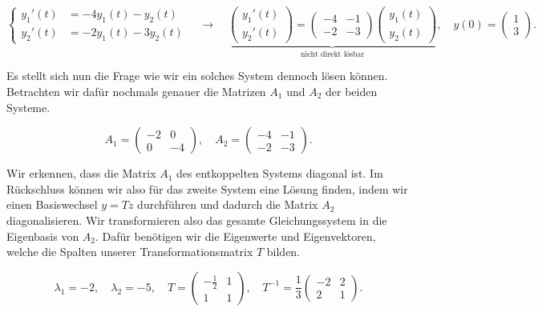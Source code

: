 \begin{equation*}
    \left\{ 
        \begin{aligned}
            y_1'(t) &= -4 y_1(t) - y_2(t) \\
            y_2'(t) &= -2 y_1(t) - 3 y_2(t)
        \end{aligned}
    \right. \quad \longrightarrow \quad
    \underbrace{\begin{pmatrix}
        y_1'(t) \\
        y_2'(t)
    \end{pmatrix} =
    \begin{pmatrix}
        -4 & -1 \\
        -2 & -3
    \end{pmatrix}
    \begin{pmatrix}
        y_1(t) \\
        y_2(t)
    \end{pmatrix}}_{\text{nicht direkt lösbar}}, \quad y(0)=
    \begin{pmatrix}
        1 \\
        3
    \end{pmatrix}.
\end{equation*}

Es stellt sich nun die Frage wie wir ein solches System dennoch lösen können. Betrachten wir dafür nochmals genauer die Matrizen \( A_1\) und \( A_2 \) der beiden Systeme.

\begin{equation*}
    A_1 = \begin{pmatrix}
        -2 & 0 \\
        0 & -4
    \end{pmatrix}, \quad
    A_2 = \begin{pmatrix}
        -4 & -1 \\
        -2 & -3
    \end{pmatrix}.
\end{equation*}

Wir erkennen, dass die Matrix \( A_1 \) des entkoppelten Systems diagonal ist. Im Rückschluss können wir also für das zweite System eine Lösung finden, indem wir einen Basiswechsel \( y = Tz \) durchführen und dadurch die Matrix \( A_2 \) diagonalisieren. Wir transformieren also das gesamte Gleichungssystem in die Eigenbasis von \( A_2 \). Dafür benötigen wir die Eigenwerte und Eigenvektoren, welche die Spalten unserer Transformationsmatrix \( T \) bilden.   

\begin{equation*}
    \lambda_1 = -2, \quad \lambda_2 = -5, \quad T = \begin{pmatrix}
        -\frac{1}{2} & 1 \\
        1 & 1
    \end{pmatrix}, \quad T^{-1} = \frac{1}{3} \begin{pmatrix}
        -2 & 2 \\
        2 & 1
    \end{pmatrix}.
\end{equation*}


